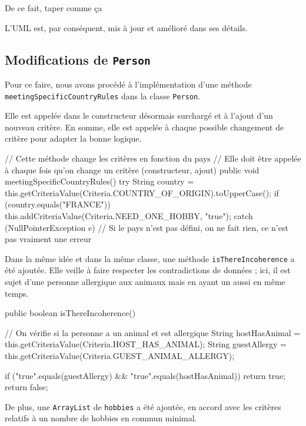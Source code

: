 \documentclass{mytex}
\begin{document}
De ce fait, taper comme ça

L'UML est, par conséquent, mis à jour et amélioré dans ses détails.


\subsection{Modifications de \texttt{Person}}

Pour ce faire, nous avons procédé à l'implémentation d'une méthode \texttt{meetingSpecificCountryRules} dans la classe \texttt{Person}.

Elle est appelée dans le constructeur désormais surchargé et à l'ajout d'un nouveau critère. En somme, elle est appelée à chaque possible changement de critère pour adapter la bonne logique.

\begin{codebox}
    // Cette méthode change les critères en fonction du pays
	// Elle doit être appelée à chaque fois qu'on change un critère (constructeur, ajout)
public void meetingSpecificCountryRules() {
	try {
		String country = this.getCriteriaValue(Criteria.COUNTRY_OF_ORIGIN).toUpperCase();
		if (country.equals("FRANCE")) {
			this.addCriteriaValue(Criteria.NEED_ONE_HOBBY, "true");
		}
	} catch (NullPointerException e) {
		// Si le pays n'est pas défini, on ne fait rien, ce n'est pas vraiment une erreur
	}
}
\end{codebox}

Dans la même idée et dans la même classe, une méthode \texttt{isThereIncoherence} a été ajoutée. Elle veille à faire respecter les contradictions de données ; ici, il est sujet d'une personne allergique aux animaux mais en ayant un aussi en même temps.

\begin{codebox}
public boolean isThereIncoherence() {
	// On vérifie si la personne a un animal et est allergique
	String hostHasAnimal = this.getCriteriaValue(Criteria.HOST_HAS_ANIMAL);
	String guestAllergy = this.getCriteriaValue(Criteria.GUEST_ANIMAL_ALLERGY);
	
	if ("true".equals(guestAllergy) && "true".equals(hostHasAnimal)) {
		return true;
	}
	return false;
}
\end{codebox}

De plus, une \texttt{ArrayList} de \texttt{hobbies} a été ajoutée, en accord avec les critères relatifs à un nombre de hobbies en commun minimal.
\end{document}
